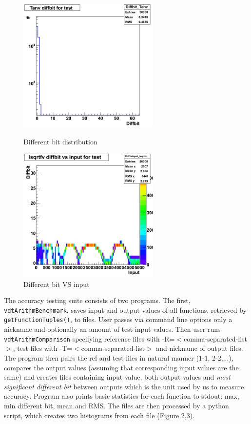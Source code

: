 \documentclass[oneside,10pt,a4paper]{article}
\begin{document}
\begin{figure}[h]
        \begin{minipage}[l]{0.5\textwidth}
           \center
           \includegraphics[width=70mm]{diffbit.png}
           \caption{Different bit distribution}
        \end{minipage}
        \begin{minipage}[r]{0.5\textwidth}
            \center
            \includegraphics[width=70mm]{inputVSdiffbit.png}
            \caption{Different bit VS input}
        \end{minipage}
        \label{plots}
\end{figure}
The accuracy testing suite consists of two programs. The first, {\tt vdtArithmBenchmark}, saves input and output values of all functions, retrieved by {\tt getFunctionTuples()}, to files. User passes via command line options only a nickname and optionally an amount of test input values. Then user runs {\tt vdtArithmComparison} specifying reference files with -R=$<$comma-separated-list$>$, test files with -T=$<$comma-separated-list$>$ and nickname of output files. The program then pairs the ref and test files in natural manner (1-1, 2-2,...), compares the output values (assuming that corresponding input values are the same) and creates files containing input value, both output values and \emph{most significant different bit} between outputs which is the unit used by us to measure accuracy. Program also prints basic statistics for each function to stdout: max, min different bit, mean and RMS. The files are then processed by a python script, which creates two histograms from each file (Figure 2,3).
\end{document}
